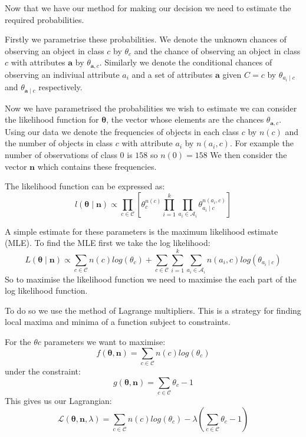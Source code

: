Now that we have our method for making our decision we need to estimate the required probabilities.

Firstly we parametrise these probabilities.
We denote the unknown chances of observing an object in class $c$ by $\theta_c$ and the chance of observing an object in class $c$ with attributes $\mathbf{a}$ by $\theta_{\mathbf{a}, c}$.
Similarly we denote the conditional chances of observing an indiviual attribute $a_i$ and a set of attributes $\mathbf{a}$ given $C=c$ by $\theta_{a_i \mid c}$ and $\theta_{\mathbf{a} \mid c}$ respectively.

Now we have parametrised the probabilities we wish to estimate we can consider the likelihood function for $\mathbf{\theta}$, the vector whose elements are the chances $\theta_{\mathbf{a}, c}$.
Using our data we denote the frequencies of objects in each class $c$ by $n(c)$ and the number of objects in class $c$ with attribute $a_i$ by $n(a_i, c)$.
For example the number of observations of class $0$ is $158$ so $n(0) = 158$
We then consider the vector $\mathbf{n}$ which contains these frequencies.

The likelihood function can be expressed as:
\begin{equation} \label{likelihood}
	l(\mathbf{\theta} \mid \mathbf{n}) \propto \prod_{c \in \mathcal{C}} \left[ \theta_c^{n(c)} \prod_{i=1}^k \prod_{a_i \in \mathcal{A}_i} \theta_{a_i \mid c}^{n(a_i, c)} \right]
\end{equation}

A simple estimate for these parameters is the maximum likelihood estimate (MLE).
To find the MLE first we take the log likelihood:
\begin{equation}
	L(\mathbf{\theta} \mid \mathbf{n}) \propto \sum_{c \in \mathcal{C}}  n(c)log(\theta_c) + \sum_{c \in \mathcal{C}} \sum_{i=1}^k \sum_{a_i \in \mathcal{A}_i} n(a_i, c) log(\theta_{a_i \mid c}) 
\end{equation}
So to maximise the likelihood function we need to maximise the each part of the log likelihood function.

To do so we use the method of Lagrange multipliers.
This is a strategy for finding local maxima and minima of a function subject to constraints.

For the $\theta{c}$ parameters we want to maximise:
\begin{equation}
	f(\mathbf{\theta}, \mathbf{n}) = \sum_{c \in \mathcal{C}}  n(c)log(\theta_c)
\end{equation}
under the constraint:
\begin{equation}
	g(\mathbf{\theta}, \mathbf{n}) = \sum_{c \in \mathcal{C}}  \theta_c - 1
\end{equation}
This gives us our Lagrangian:
\begin{equation}
	\mathcal{L}(\mathbf{\theta}, \mathbf{n}, \lambda) = \sum_{c \in \mathcal{C}}  n(c)log(\theta_c) - \lambda(\sum_{c \in \mathcal{C}}  \theta_c - 1)
\end{equation}

